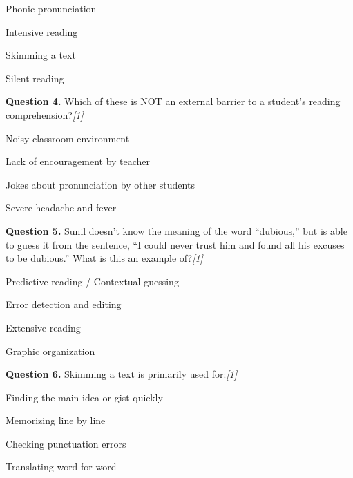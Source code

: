 \documentclass[11pt,a4paper]{article}
\newcommand{\pts}[1]{\hfill   \textit{[#1]}}
\begin{document}
\begin{parts}
  \item Phonic pronunciation
  \item Intensive reading
  \item Skimming a text
  \item Silent reading
\end{parts}

\medskip




\noindent   \textbf{Question 4.} Which of these is NOT an external barrier to a student's reading comprehension?\pts{1}

\begin{parts}
  \item Noisy classroom environment
  \item Lack of encouragement by teacher
  \item Jokes about pronunciation by other students
  \item Severe headache and fever
\end{parts}

\medskip




\noindent   \textbf{Question 5.} Sunil doesn't know the meaning of the word ``dubious,'' but is able to guess it from the sentence, ``I could never trust him and found all his excuses to be dubious.'' What is this an example of?\pts{1}

\begin{parts}
  \item Predictive reading / Contextual guessing
  \item Error detection and editing
  \item Extensive reading
  \item Graphic organization
\end{parts}

\medskip




\noindent   \textbf{Question 6.} Skimming a text is primarily used for:\pts{1}

\begin{parts}
  \item Finding the main idea or gist quickly
  \item Memorizing line by line
  \item Checking punctuation errors
  \item Translating word for word
\end{parts}
\end{document}
